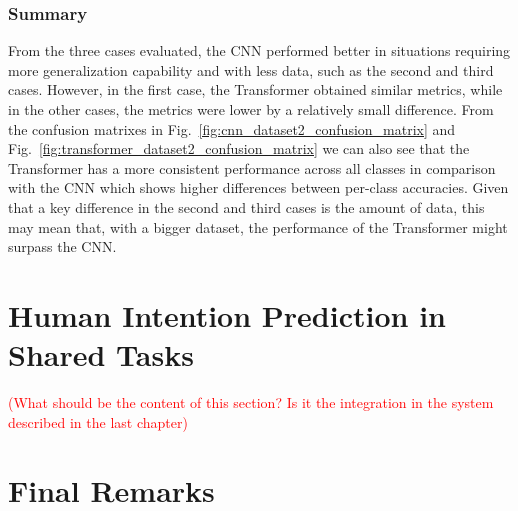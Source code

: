 \subsubsection{Summary}

From the three cases evaluated, the CNN performed better in situations requiring more generalization capability and with less data, such as the second and third cases. However, in the first case, the Transformer obtained similar metrics, while in the other cases, the metrics were lower by a relatively small difference. From the confusion matrixes in Fig.~\ref{fig:cnn_dataset2_confusion_matrix} and Fig.~\ref{fig:transformer_dataset2_confusion_matrix} we can also see that the Transformer has a more consistent performance across all classes in comparison with the CNN which shows higher differences between per-class accuracies. Given that a key difference in the second and third cases is the amount of data, this may mean that, with a bigger dataset, the performance of the Transformer might surpass the CNN.

\section{Human Intention Prediction in Shared Tasks}

\textcolor{red}{(What should be the content of this section? Is it the integration in the system described in the last chapter)}

\section{Final Remarks}